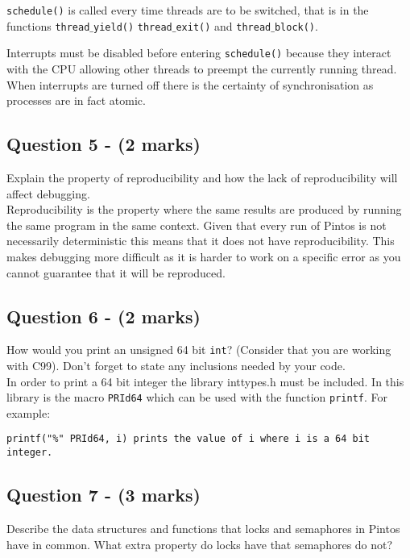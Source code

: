 \documentclass[a4paper,12pt]{article}
\begin{document}
\texttt{schedule()} is called every time threads are to be switched, that is in the functions \texttt{thread$\_$yield()} \texttt{thread$\_$exit()} and \texttt{thread$\_$block()}.

Interrupts must be disabled before entering \texttt{schedule()} because they interact with the CPU allowing other threads to preempt the currently running thread. When interrupts are turned off there is the certainty of synchronisation as processes are in fact atomic.

\subsection*{Question 5 - (2 marks)}
Explain the property of reproducibility and how the lack of reproducibility will affect debugging. \\

Reproducibility is the property where the same results are produced by running the same program in the same context. Given that every run of Pintos is not necessarily deterministic this means that it does not have reproducibility. This makes debugging more difficult as it is harder to work on a specific error as you cannot guarantee that it will be reproduced.

\subsection*{Question 6 - (2 marks)}
How would you print an unsigned 64 bit \texttt{int}?
(Consider that you are working with C99).
Don't forget to state any inclusions needed by your code. \\

In order to print a 64 bit integer the library inttypes.h must be included. In this library is the macro \texttt{PRId64} which can be used with the function \texttt{printf}. For example:

\begin{verbatim}
printf("%" PRId64, i) prints the value of i where i is a 64 bit integer.
\end{verbatim}

\subsection*{Question 7 - (3 marks)}
Describe the data structures and functions that locks and semaphores in Pintos have in common.
What extra property do locks have that semaphores do not? \\
\end{document}
